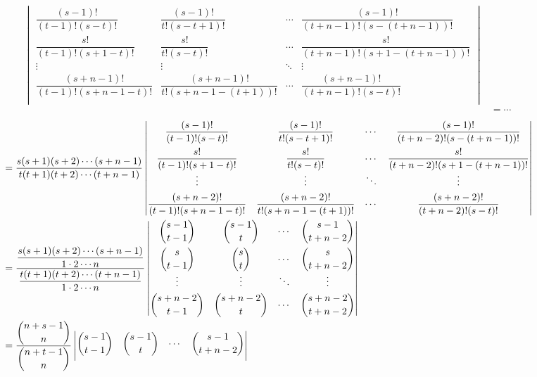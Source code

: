 \documentclass[color=black,device=normal,lang=cn,mode=geye]{elegantnote}
\begin{document}
\begin{solution}
\begin{landscape}
\begin{align*}
\begin{vmatrix}
                \dfrac{(s-1)!}{(t-1)!(s-t)!} & \dfrac{(s-1)!}{t!(s-t+1)!} & \cdots & \dfrac{(s-1)!}{(t+n-1)!(s-(t+n-1))!} \\[10pt]
                \dfrac{s!}{(t-1)!(s+1-t)!} & \dfrac{s!}{t!(s-t)!} & \cdots & \dfrac{s!}{(t+n-1)!(s+1-(t+n-1))!} \\
                \vdots & \vdots & \ddots & \vdots \\[4pt]
                \dfrac{(s+n-1)!}{(t-1)!(s+n-1-t)!} & \dfrac{(s+n-1)!}{t!(s+n-1-(t+1))!} & \cdots & \dfrac{(s+n-1)!}{(t+n-1)!(s-t)!} \\
            \end{vmatrix} \\
            & =\cdots
        \end{align*}
        \begin{align*}
            & =\dfrac{s(s+1)(s+2)\cdots(s+n-1)}{t(t+1)(t+2)\cdots(t+n-1)}\begin{vmatrix}
                \dfrac{(s-1)!}{(t-1)!(s-t)!} & \dfrac{(s-1)!}{t!(s-t+1)!} & \cdots & \dfrac{(s-1)!}{(t+n-2)!(s-(t+n-1))!} \\[10pt]
                \dfrac{s!}{(t-1)!(s+1-t)!} & \dfrac{s!}{t!(s-t)!} & \cdots & \dfrac{s!}{(t+n-2)!(s+1-(t+n-1))!} \\
                \vdots & \vdots & \ddots & \vdots \\[4pt]
                \dfrac{(s+n-2)!}{(t-1)!(s+n-1-t)!} & \dfrac{(s+n-2)!}{t!(s+n-1-(t+1))!} & \cdots & \dfrac{(s+n-2)!}{(t+n-2)!(s-t)!} \\
            \end{vmatrix} \\
            & =\dfrac{\dfrac{s(s+1)(s+2)\cdots(s+n-1)}{1\cdot2\cdots n}}{\dfrac{t(t+1)(t+2)\cdots(t+n-1)}{1\cdot2\cdots n}}\begin{vmatrix}
                \dbinom{s-1}{t-1} & \dbinom{s-1}{t} & \cdots & \dbinom{s-1}{t+n-2} \\[10pt]
                \dbinom{s}{t-1} & \dbinom{s}{t} & \cdots & \dbinom{s}{t+n-2} \\
                \vdots & \vdots & \ddots & \vdots \\[4pt]
                \dbinom{s+n-2}{t-1} & \dbinom{s+n-2}{t} & \cdots & \dbinom{s+n-2}{t+n-2} \\
            \end{vmatrix} \\
            & =\dfrac{\dbinom{n+s-1}{n}}{\dbinom{n+t-1}{n}}\begin{vmatrix}
                \dbinom{s-1}{t-1} & \dbinom{s-1}{t} & \cdots & \dbinom{s-1}{t+n-2} \\[10pt]

\end{vmatrix}
\end{align*}
\end{landscape}
\end{solution}
\end{document}
